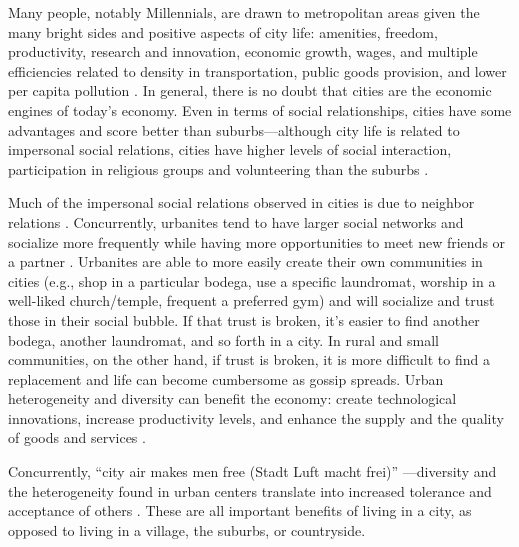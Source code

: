 \documentclass[11pt, letterpaper]{article}
\begin{document}
\begin{spacing}{1.4}
Many people, notably  Millennials, are drawn to metropolitan areas \citep{aok-swbGenYcity18} given the many bright sides and positive aspects of city life: amenities, freedom, productivity, research and innovation, economic growth, wages, and multiple efficiencies related to
density in transportation, public goods provision, and lower per capita pollution \citep{tonnies57,osullivan09,meyer13,rosenthal02,bettencourt10}.
 In general, there is no doubt that cities are the economic engines of today's
 economy. 
 Even in terms of social relationships, cities have some advantages and score better than suburbs---although city life is related to impersonal social relations, cities have higher levels of social interaction, participation in religious groups and volunteering than the suburbs \citep{nguyen10,mazumdar18}.    
    
Much of the impersonal social relations observed in cities is due to neighbor
relations \citep{nguyen10,mazumdar18}. Concurrently, urbanites tend to have
larger social networks and socialize more frequently while having more
opportunities to meet new friends or a partner
\citep{mouratidis18,anon17-cities-oslo}.
Urbanites are able to more easily
create their own communities in cities (e.g., shop in a particular bodega, use a
specific laundromat, worship in a well-liked church/temple, frequent a preferred
gym) and will socialize and trust those in their social bubble. If that trust is
broken, it's easier to find another bodega, another laundromat, and so forth in
a city. {In rural and small communities, on the other hand, if trust is broken, it is more difficult to find a replacement and life can become cumbersome as gossip spreads.}
Urban heterogeneity and diversity can benefit the economy: create technological
innovations, increase productivity levels, and enhance the supply and the
quality of goods and services \citep{rodriguez2019does}.



Concurrently, ``city air makes men free (Stadt Luft macht frei)'' \citep[p.12]{park84}---diversity and the heterogeneity found in urban centers translate into increased tolerance and acceptance of others \citep{tuch87,wirth38,stephan82,aok20}. These are all important benefits of living in a city, as opposed to living in a village, the suburbs, or countryside.


\end{spacing}
\end{document}
